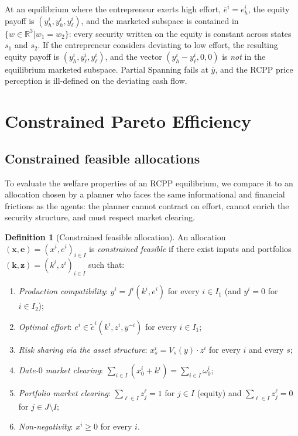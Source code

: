 \documentclass[11pt,a4paper,oneside]{book}
\def\R{\mathbb{R}}
\def\geq{\geqslant}
\theoremstyle{plain}
\theoremstyle{definition}
\newtheorem{definition}[theorem]{Definition}
\theoremstyle{remark}
\numberwithin{equation}{chapter}
\begin{document}
At an equilibrium where the entrepreneur exerts high effort, $\overline{e}^i = e^i_h$, the equity payoff is $(y^i_h, y^i_h, y^i_\ell)$, and the marketed subspace is contained in $\{ w \in \R^3 \vert w_1 = w_2 \}$: every security written on the equity is constant across states $s_1$ and $s_2$.
If the entrepreneur considers deviating to low effort, the resulting equity payoff is $(y^i_h, y^i_\ell, y^i_\ell)$, and the vector $(y^i_h - y^i_\ell, 0, 0)$ is \emph{not} in the equilibrium marketed subspace.
Partial Spanning fails at $\overline{y}$, and the RCPP price perception is ill-defined on the deviating cash flow.

\section{Constrained Pareto Efficiency}
\label{sec:MH-CPO}

\subsection{Constrained feasible allocations}

To evaluate the welfare properties of an RCPP equilibrium, we compare it to an allocation chosen by a planner who faces the same informational and financial frictions as the agents: the planner cannot contract on effort, cannot enrich the security structure, and must respect market clearing.

\begin{definition}[Constrained feasible allocation]\label{def:MH-feasible}
An allocation $(\bm{x}, \bm{e}) = (x^i, e^i)_{i \in I}$ is \emph{constrained feasible} if there exist inputs and portfolios $(\bm{k}, \bm{z}) = (k^i, z^i)_{i \in I}$ such that:
\begin{enumerate}
  \item[(i)] \emph{Production compatibility}: $y^i = f^i(k^i, e^i)$ for every $i \in I_1$ (and $y^i = 0$ for $i \in I_2$);
  \item[(ii)] \emph{Optimal effort}: $e^i \in \widetilde{e}^i(k^i, z^i, y^{-i})$ for every $i \in I_1$;
  \item[(iii)] \emph{Risk sharing via the asset structure}: $x^i_s = V_s(y) \cdot z^i$ for every $i$ and every $s$;
  \item[(iv)] \emph{Date-$0$ market clearing}: $\sum_{i \in I} (x^i_0 + k^i) = \sum_{i \in I} \omega^i_0$;
  \item[(v)] \emph{Portfolio market clearing}: $\sum_{\ell \in I} z^\ell_j = 1$ for $j \in I$ (equity) and $\sum_{\ell \in I} z^\ell_j = 0$ for $j \in J \setminus I$;
  \item[(vi)] \emph{Non-negativity}: $x^i \geq 0$ for every $i$.
\end{enumerate}
\end{definition}
\end{document}
